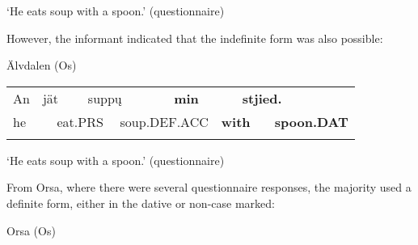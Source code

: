 \begin{styleTranslation}
‘He eats soup with a spoon.’ (questionnaire)

\end{styleTranslation}

However, the informant indicated that the indefinite form was also possible:

\begin{listWWNumileveli}
\item 

\begin{styleExample}
Älvdalen (Os)

\end{styleExample}

\end{listWWNumileveli}

\begin{tabular}{llllllllll}
\lsptoprule
An & \multicolumn{2}{l}{jät

} & \multicolumn{2}{l}{supp\k{u}

} & \multicolumn{2}{l}{{\bfseries min}

} & \multicolumn{2}{l}{{\bfseries stjied.}

} & \\
\multicolumn{2}{l}{he

} & \multicolumn{2}{l}{eat.PRS

} & \multicolumn{2}{l}{soup.DEF.ACC

} & \multicolumn{2}{l}{{\bfseries with}

} & \multicolumn{2}{l}{{\bfseries spoon.DAT}

}\\
\lspbottomrule
\end{tabular}

\begin{styleTranslation}
‘He eats soup with a spoon.’ (questionnaire)

\end{styleTranslation}

From Orsa, where there were several questionnaire responses, the majority used a definite form, either in the dative or non-case marked:

\begin{listWWNumileveli}
\item 

\begin{styleExample}
Orsa (Os)

\end{styleExample}

\end{listWWNumileveli}

